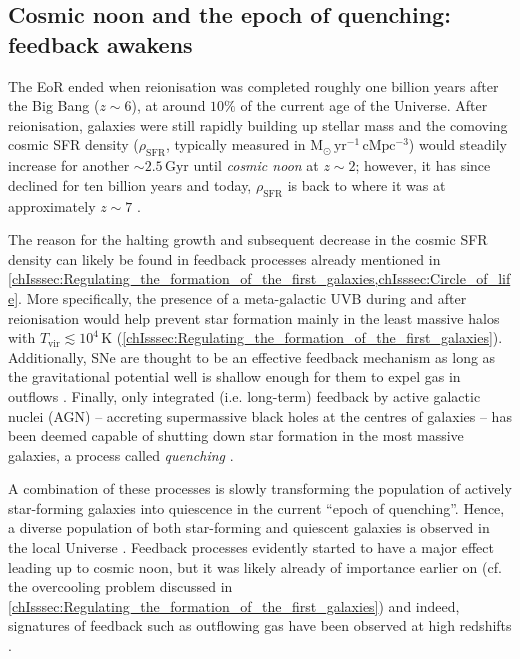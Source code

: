 \subsection{Cosmic noon and the epoch of quenching: feedback awakens}
\label{chIssec:Cosmic_noon_and_the_epoch_of_quenching}

The EoR ended when reionisation was completed roughly one billion years after the Big Bang ($z \sim 6$), at around $10\%$ of the current age of the Universe. After reionisation, galaxies were still rapidly building up stellar mass and the comoving cosmic SFR density ($\rho_\text{SFR}$, typically measured in $\mathrm{M_\odot \, yr^{-1} \, cMpc^{-3}}$) would steadily increase for another $\sim 2.5 \, \mathrm{Gyr}$ until \textit{cosmic noon} at $z \sim 2$; however, it has since declined for ten billion years and today, $\rho_\text{SFR}$ is back to where it was at approximately $z \sim 7$ \citep{2014ARA&A..52..415M}.

The reason for the halting growth and subsequent decrease in the cosmic SFR density can likely be found in feedback processes already mentioned in \cref{chIsssec:Regulating_the_formation_of_the_first_galaxies,chIsssec:Circle_of_life}. More specifically, the presence of a meta-galactic UVB during and after reionisation \citep{2012ApJ...746..125H} would help prevent star formation mainly in the least massive halos with $T_\text{vir} \lesssim 10^4 \, \mathrm{K}$ (\cref{chIsssec:Regulating_the_formation_of_the_first_galaxies}). Additionally, SNe are thought to be an effective feedback mechanism as long as the gravitational potential well is shallow enough for them to expel gas in outflows \citep{2015MNRAS.446..521S}. Finally, only integrated (i.e. long-term) feedback by active galactic nuclei (AGN) -- accreting supermassive black holes at the centres of galaxies -- has been deemed capable of shutting down star formation in the most massive galaxies, a process called \textit{quenching} \citep[e.g.][]{2022MNRAS.512.1052P}.

A combination of these processes is slowly transforming the population of actively star-forming galaxies into quiescence in the current ``epoch of quenching''. Hence, a diverse population of both star-forming and quiescent galaxies is observed in the local Universe \citep{2010ApJ...721..193P}. Feedback processes evidently started to have a major effect leading up to cosmic noon, but it was likely already of importance earlier on (cf. the overcooling problem discussed in \cref{chIsssec:Regulating_the_formation_of_the_first_galaxies}) and indeed, signatures of feedback such as outflowing gas have been observed at high redshifts \citep[e.g.][]{2022ApJ...934...64A}.

